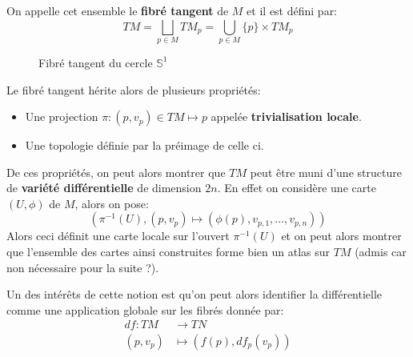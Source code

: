 On appelle cet ensemble le \textbf{fibré tangent} de \( M \) et il est défini par:
\[ 
   TM = \bigsqcup_{p \in M} TM_p = \bigcup_{p \in M} \{p\} \times TM_p
\]
\begin{figure}[h]
   \centering
   \caption{Fibré tangent du cercle \( \mathbb{S}^1 \)}
\end{figure}

Le fibré tangent hérite alors de plusieurs propriétés:
\begin{itemize}
   \item Une projection \( \pi : (p, v_p) \in TM \mapsto p\) appelée \textbf{trivialisation locale}.
   \item Une topologie définie par la préimage de celle ci.
\end{itemize}
De ces propriétés, on peut alors montrer que \( TM \) peut être muni d'une structure de \textbf{variété différentielle} de dimension \( 2n \). En effet on considère une carte \( (U, \phi) \) de \( M \), alors on pose:
\[ 
   \left(\pi^{-1}(U), (p, v_p) \mapsto (\phi(p), v_{p, 1}, \ldots, v_{p, n}) \right)
\]
Alors ceci définit une carte locale sur l'ouvert \(\pi^{-1}(U)\) et on peut alors montrer que l'ensemble des cartes ainsi construites forme bien un atlas sur \( TM \) (admis car non nécessaire pour la suite ?).\<

Un des intérêts de cette notion est qu'on peut alors identifier la différentielle comme une application globale sur les fibrés donnée par:
\[ 
   \begin{aligned}
      df : TM &\longrightarrow TN \\
      (p, v_p) &\longmapsto (f(p), df_p(v_p))
   \end{aligned} 
\]
